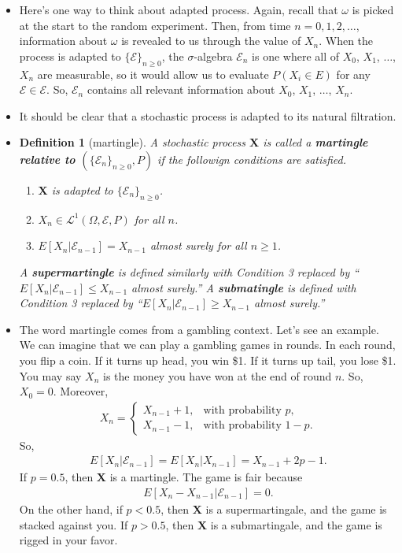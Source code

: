 \documentclass[10pt]{article}
\newtheorem{definition}[lemma]{Definition}
\numberwithin{lemma}{section}
\newcommand{\ve}[1]{\mathbf{#1}}
\newcommand{\mcal}[1]{\mathcal{#1}}
\begin{document}
\begin{itemize}
  \item Here's one way to think about adapted process. Again, recall that $\omega$ is picked at the start to the random experiment. Then, from time $n = 0, 1, 2, \dotsc$, information about $\omega$ is revealed to us through the value of $X_n$. When the process is adapted to $\{ \mcal{E} \}_{n \geq 0}$, the $\sigma$-algebra $\mcal{E}_n$ is one where all of $X_0$, $X_1$, $\dotsc$, $X_n$ are measurable, so it would allow us to evaluate $P(X_i \in E)$ for any $\mcal{E} \in \mcal{E}$. So, $\mcal{E}_n$ contains all relevant information about $X_0$, $X_1$, $\dotsc$, $X_n$.
  
  \item It should be clear that a stochastic process is adapted to its natural filtration.
  
  \item \begin{definition}[martingle]
    A stochastic process $\ve{X}$ is called a {\bf martingle relative to $(\{ \mcal{E}_n\}_{n \geq 0}, P)$} if the followign conditions are satisfied.
    \begin{enumerate}
      \item $\ve{X}$ is adapted to $\{ \mcal{E}_n \}_{n \geq 0}$.
      \item $X_n \in \mcal{L}^1(\Omega,\mcal{E},P)$ for all $n$.
      \item $E[X_n|\mcal{E}_{n-1}] = X_{n-1}$ almost surely for all $n \geq 1$.
    \end{enumerate}
    A {\bf supermartingle} is defined similarly with Condition 3 replaced by ``$E[X_n|\mcal{E}_{n-1}] \leq X_{n-1}$ almost surely.'' A {\bf submatingle} is defined with Condition 3 replaced by ``$E[X_n|\mcal{E}_{n-1}] \geq X_{n-1}$ almost surely.''
  \end{definition}

  \item The word martingle comes from a gambling context. Let's see an example. We can imagine that we can play a gambling games in rounds. In each round, you flip a coin. If it turns up head, you win \$1. If it turns up tail, you lose \$1. You may say $X_n$ is the money you have won at the end of round $n$. So, $X_0 = 0$. Moreover,
  \begin{align*}
    X_n = \begin{cases}
      X_{n-1} + 1, & \mbox{with probability }p, \\
      X_{n-1} - 1, & \mbox{with probability }1-p.
    \end{cases}
  \end{align*}
  So,
  \begin{align*}
    E[X_n|\mcal{E}_{n-1}] = E[X_n|X_{n-1}] = X_{n-1} + 2p - 1.
  \end{align*}
  If $p = 0.5$, then $\ve{X}$ is a martingle. The game is fair because
  \begin{align*}
    E[X_n - X_{n-1}|\mcal{E}_{n-1}] = 0.
  \end{align*}
  On the other hand, if $p < 0.5$, then $\ve{X}$ is a supermartingale, and the game is stacked against you. If $p > 0.5$, then $\ve{X}$ is a submartingale, and the game is rigged in your favor.


\end{itemize}
\end{document}
